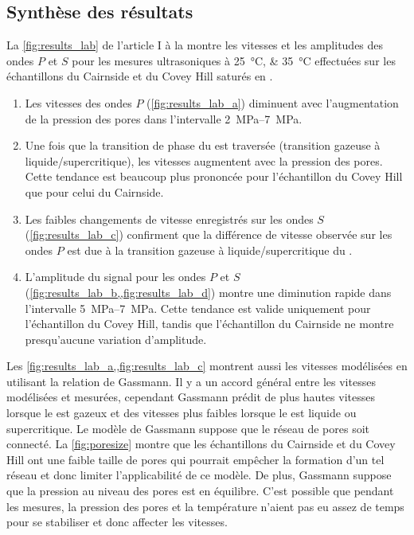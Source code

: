 \subsection{Synthèse des résultats}
La \cref{fig:results_lab} de l'article I à la  montre les vitesses et les amplitudes des ondes $P$ et $S$ pour les mesures ultrasoniques à \SIlist{25;35}{\degreeCelsius} effectuées sur les échantillons du Cairnside et du Covey Hill saturés en .
\begin{enumerate}[-]
\item Les vitesses des ondes $P$ (\cref{fig:results_lab_a}) diminuent avec l'augmentation de la pression des pores dans l'intervalle \SIrange{2}{7}{\mega\pascal}.
\item Une fois que la transition de phase du  est traversée (transition gazeuse à liquide/supercritique), les vitesses augmentent avec la pression des pores. Cette tendance est beaucoup plus prononcée pour l’échantillon du Covey Hill que pour celui du Cairnside. 
\item Les faibles changements de vitesse enregistrés sur les ondes $S$ (\cref{fig:results_lab_c}) confirment que la différence de vitesse observée sur les ondes $P$ est due à la transition gazeuse à liquide/supercritique du . 
\item L'amplitude du signal pour les ondes $P$ et $S$ (\cref{fig:results_lab_b,,fig:results_lab_d}) montre une diminution rapide dans l'intervalle \SIrange{5}{7}{\mega\pascal}. Cette tendance est valide uniquement pour l'échantillon du Covey Hill, tandis que l’échantillon du Cairnside ne montre presqu'aucune variation d'amplitude.
\end{enumerate}
Les \cref{fig:results_lab_a,,fig:results_lab_c} montrent aussi les vitesses modélisées en utilisant la relation de Gassmann. Il y a un accord général entre les vitesses modélisées et mesurées, cependant Gassmann prédit de plus hautes vitesses lorsque le  est gazeux et des vitesses plus faibles lorsque le  est liquide ou supercritique. Le modèle de Gassmann suppose que le réseau de pores soit connecté. La \cref{fig:poresize} montre que les échantillons du Cairnside et du Covey Hill ont une faible taille de pores qui pourrait empêcher la formation d’un tel réseau et donc limiter l’applicabilité de ce modèle. De plus, Gassmann suppose que la pression au niveau des pores est en équilibre. C’est possible que pendant les mesures, la pression des pores et la température n’aient pas eu assez de temps pour se stabiliser et donc affecter les vitesses. 
